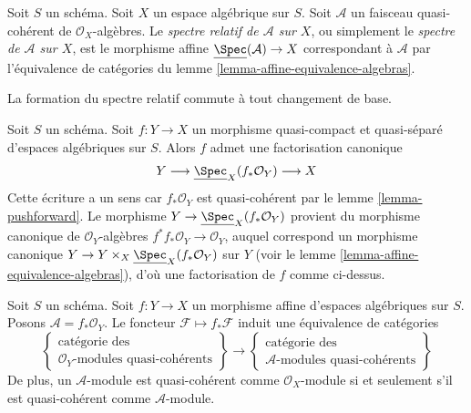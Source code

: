 \begin{definition}
\label{definition-relative-spec}
Soit $S$ un schéma. Soit $X$ un espace algébrique sur $S$.
Soit $\mathcal{A}$ un faisceau quasi-cohérent de
$\mathcal{O}_X$-algèbres. Le {\it spectre relatif de $\mathcal{A}$ sur
$X$}, ou simplement le {\it spectre de $\mathcal{A}$ sur $X$}, est le
morphisme affine $\underline{\Spec}(\mathcal{A}) \to X$
correspondant à $\mathcal{A}$ par l'équivalence de catégories du
lemme \ref{lemma-affine-equivalence-algebras}.
\end{definition}

\noindent
La formation du spectre relatif commute à tout changement de base.

\begin{remark}
\label{remark-factorization-quasi-compact-quasi-separated}
Soit $S$ un schéma. Soit $f : Y \to X$ un morphisme quasi-compact et
quasi-séparé d'espaces algébriques sur $S$. Alors
$f$ admet une factorisation canonique
$$
Y \longrightarrow \underline{\Spec}_X(f_*\mathcal{O}_Y) \longrightarrow X
$$
Cette écriture a un sens car $f_*\mathcal{O}_Y$ est quasi-cohérent
par le lemme \ref{lemma-pushforward}. Le morphisme
$Y \to \underline{\Spec}_X(f_*\mathcal{O}_Y)$ provient du
morphisme canonique de $\mathcal{O}_Y$-algèbres
$f^*f_*\mathcal{O}_Y \to \mathcal{O}_Y$, auquel correspond
un morphisme canonique
$Y \to Y \times_X \underline{\Spec}_X(f_*\mathcal{O}_Y)$ sur $Y$ (voir
le lemme \ref{lemma-affine-equivalence-algebras}), d'où une factorisation
de $f$ comme ci-dessus.
\end{remark}

\begin{lemma}
\label{lemma-affine-equivalence-modules}
Soit $S$ un schéma.
Soit $f : Y \to X$ un morphisme affine d'espaces algébriques sur $S$.
Posons $\mathcal{A} = f_*\mathcal{O}_Y$.
Le foncteur $\mathcal{F} \mapsto f_*\mathcal{F}$ induit
une équivalence de catégories
$$
\left\{
\begin{matrix}
\text{catégorie des}\\
\mathcal{O}_Y\text{-modules quasi-cohérents}
\end{matrix}
\right\}
\longrightarrow
\left\{
\begin{matrix}
\text{catégorie des}\\
\mathcal{A}\text{-modules quasi-cohérents}
\end{matrix}
\right\}
$$
De plus, un $\mathcal{A}$-module est
quasi-cohérent comme $\mathcal{O}_X$-module si et seulement s'il
est quasi-cohérent comme $\mathcal{A}$-module.
\end{lemma}

